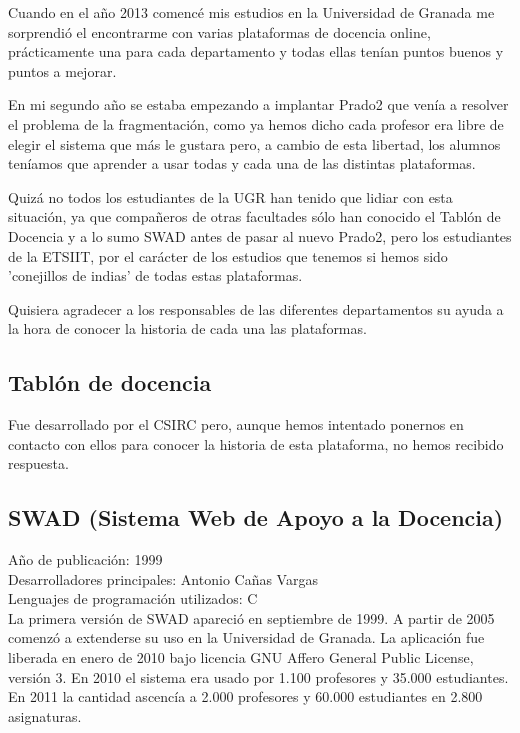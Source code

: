 Cuando en el año 2013 comencé mis estudios en la Universidad de Granada me sorprendió el encontrarme con varias plataformas de docencia online, prácticamente una para cada departamento y todas ellas tenían puntos buenos y puntos a mejorar.

\bigskip
En mi segundo año se estaba empezando a implantar Prado2 que venía a resolver el problema de la fragmentación, como ya hemos dicho cada profesor era libre de elegir el sistema que más le gustara pero, a cambio de esta libertad, los alumnos teníamos que aprender a usar todas y cada una de las distintas plataformas.

\bigskip
Quizá no todos los estudiantes de la UGR han tenido que lidiar con esta situación, ya que compañeros de otras facultades sólo han conocido el Tablón de Docencia y a lo sumo SWAD antes de pasar al nuevo Prado2, pero los estudiantes de la ETSIIT, por el carácter de los estudios que tenemos si hemos sido 'conejillos de indias' de todas estas plataformas.

Quisiera agradecer a los responsables de las diferentes departamentos su ayuda a la hora de conocer la historia de cada una las plataformas.

\subsection{Tablón de docencia}

Fue desarrollado por el CSIRC pero, aunque hemos intentado ponernos en contacto con ellos para conocer la historia de esta plataforma, no hemos recibido respuesta.

\subsection{SWAD (Sistema Web de Apoyo a la Docencia)}

Año de publicación: 1999\\

Desarrolladores principales: Antonio Cañas Vargas\\

Lenguajes de programación utilizados: C\\

\bigskip
La primera versión de SWAD apareció en septiembre de 1999. A partir de 2005 comenzó a extenderse su uso en la Universidad de Granada. La aplicación fue liberada en enero de 2010 bajo licencia GNU Affero General Public License, versión 3.
\bigskip
En 2010 el sistema era usado por 1.100 profesores y 35.000 estudiantes. En 2011 la cantidad ascencía a 2.000 profesores y 60.000 estudiantes en 2.800 asignaturas.

